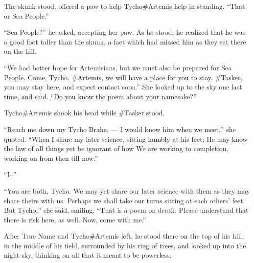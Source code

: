 The skunk stood, offered a paw to help Tycho\#Artemis help in standing. ``That or Sea People.''

``Sea People?'' he asked, accepting her paw. As he stood, he realized that he was a good foot taller than the skunk, a fact which had missed him as they sat there on the hill.

``We had better hope for Artemisians, but we must also be prepared for Sea People. Come, Tycho. \#Artemis, we will have a place for you to stay. \#Tasker, you may stay here, and expect contact soon.'' She looked up to the sky one last time, and said. ``Do you know the poem about your namesake?''

Tycho\#Artemis shook his head while \#Tasker stood.

``Reach me down my Tycho Brahe, — I would know him when we meet,'' she quoted. ``When I share my later science, sitting humbly at his feet; He may know the law of all things yet be ignorant of how We are working to completion, working on from then till now.''

``I--''

``You are both, Tycho. We may yet share our later science with them as they may share theirs with us. Perhaps we shall take our turns sitting at each others' feet. But Tycho,'' she said, smiling. ``That is a poem on death. Please understand that there is risk here, as well. Now, come with me.''

After True Name and Tycho\#Artemis left, he stood there on the top of his hill, in the middle of his field, surrounded by his ring of trees, and looked up into the night sky, thinking on all that it meant to be powerless.
